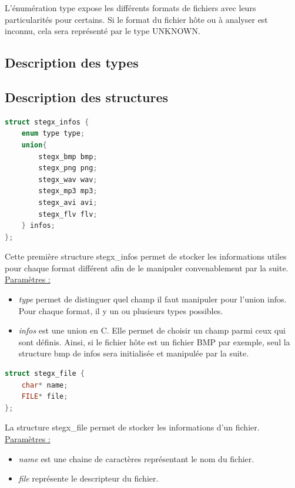 \documentclass[11pt]{article}
\begin{document}
L'énumération type expose les différents formats de fichiers avec leurs 
particularités pour certains. Si le format du fichier hôte ou à analyser 
est inconnu, cela sera représenté par le type UNKNOWN. 

\subsection{Description des types}

\subsection{Description des structures}

\begin{lstlisting}[language=c]
struct stegx_infos {
    enum type type;
    union{
        stegx_bmp bmp;
        stegx_png png;
        stegx_wav wav;
        stegx_mp3 mp3;
        stegx_avi avi;
        stegx_flv flv;
    } infos;
};
\end{lstlisting}

Cette première structure stegx\_infos permet de stocker les informations 
utiles pour chaque format différent afin de le manipuler convenablement 
par la suite. 
\newline
\underline{Paramètres :}
\begin{itemize}
\item \textit{type} permet de distinguer quel champ il faut manipuler pour l'union 
infos. Pour chaque format, il y un ou plusieurs types possibles.
\item \textit{infos} est une union en C. Elle permet de choisir un champ parmi
ceux qui sont définis. Ainsi, si le fichier hôte est un fichier BMP par exemple, 
seul la structure bmp de infos sera initialisée et manipulée par la suite.
\newline
\end{itemize}

\begin{lstlisting}[language=c]
struct stegx_file {
    char* name;
    FILE* file;
};
\end{lstlisting}

La structure stegx\_file permet de stocker les informations d'un fichier. 
\newline
\underline{Paramètres :}
\begin{itemize}
\item \textit{name} est une chaine de caractères représentant le nom du fichier. 
\item \textit{file} représente le descripteur du fichier. \newline
\end{itemize}
\end{document}
